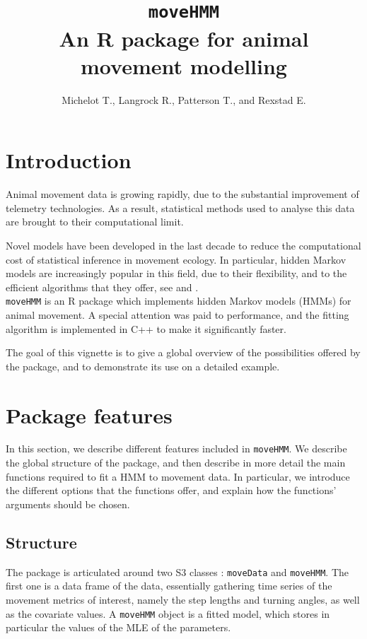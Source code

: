\documentclass[]{article}
\title{\texttt{moveHMM}\\ An R package for animal movement modelling}
\author{Michelot T., Langrock R., Patterson T., and Rexstad E.}
\begin{document}
\maketitle

\section*{Introduction}
Animal movement data is growing rapidly, due to the substantial improvement of telemetry technologies. As a result, statistical methods used to analyse this data are brought to their computational limit.

Novel models have been developed in the last decade to reduce the computational cost of statistical inference in movement ecology. In particular, hidden Markov models are increasingly popular in this field, due to their flexibility, and to the efficient algorithms that they offer, see \cite{patterson2009} and \cite{langrock2012}.\\

\texttt{moveHMM} is an R package which implements hidden Markov models (HMMs) for animal movement. A special attention was paid to performance, and the fitting algorithm is implemented in C++ to make it significantly faster.

The goal of this vignette is to give a global overview of the possibilities offered by the package, and to demonstrate its use on a detailed example.

\section{Package features}
In this section, we describe different features included in \texttt{moveHMM}. We describe the global structure of the package, and then describe in more detail the main functions required to fit a HMM to movement data. In particular, we introduce the different options that the functions offer, and explain how the functions' arguments should be chosen.

\subsection{Structure}
The package is articulated around two S3 classes : \texttt{moveData} and \texttt{moveHMM}. The first one is a data frame of the data, essentially gathering time series of the movement metrics of interest, namely the step lengths and turning angles, as well as the covariate values. A \texttt{moveHMM} object is a fitted model, which stores in particular the values of the MLE of the parameters.\\
\end{document}
